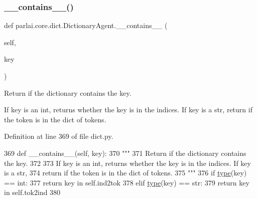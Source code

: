 \subsubsection{\texorpdfstring{\+\_\+\+\_\+contains\+\_\+\+\_\+()}{\_\_contains\_\_()}}
{\footnotesize\ttfamily def parlai.\+core.\+dict.\+Dictionary\+Agent.\+\_\+\+\_\+contains\+\_\+\+\_\+ (\begin{DoxyParamCaption}\item[{}]{self,  }\item[{}]{key }\end{DoxyParamCaption})}

\begin{DoxyVerb}Return if the dictionary contains the key.

If key is an int, returns whether the key is in the indices. If key is a str,
return if the token is in the dict of tokens.
\end{DoxyVerb}
 

Definition at line 369 of file dict.\+py.


\begin{DoxyCode}
369     \textcolor{keyword}{def }\_\_contains\_\_(self, key):
370         \textcolor{stringliteral}{"""}
371 \textcolor{stringliteral}{        Return if the dictionary contains the key.}
372 \textcolor{stringliteral}{}
373 \textcolor{stringliteral}{        If key is an int, returns whether the key is in the indices. If key is a str,}
374 \textcolor{stringliteral}{        return if the token is in the dict of tokens.}
375 \textcolor{stringliteral}{        """}
376         \textcolor{keywordflow}{if} \hyperlink{namespaceparlai_1_1agents_1_1tfidf__retriever_1_1build__tfidf_ad5dfae268e23f506da084a9efb72f619}{type}(key) == int:
377             \textcolor{keywordflow}{return} key \textcolor{keywordflow}{in} self.ind2tok
378         \textcolor{keywordflow}{elif} \hyperlink{namespaceparlai_1_1agents_1_1tfidf__retriever_1_1build__tfidf_ad5dfae268e23f506da084a9efb72f619}{type}(key) == str:
379             \textcolor{keywordflow}{return} key \textcolor{keywordflow}{in} self.tok2ind
380 
\end{DoxyCode}
\mbox{\label{classparlai_1_1core_1_1dict_1_1DictionaryAgent_a82a64989f1750412b6ffd9a4270953b3}} 

